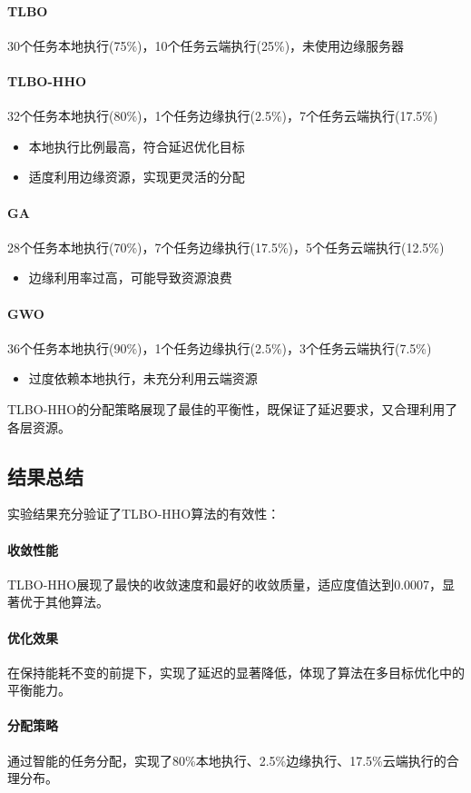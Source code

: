 \documentclass[conference]{IEEEtran}
\begin{document}
\paragraph{TLBO}30个任务本地执行(75\%)，10个任务云端执行(25\%)，未使用边缘服务器
\paragraph{TLBO-HHO}32个任务本地执行(80\%)，1个任务边缘执行(2.5\%)，7个任务云端执行(17.5\%)
    \begin{itemize}
        \item 本地执行比例最高，符合延迟优化目标
        \item 适度利用边缘资源，实现更灵活的分配
    \end{itemize}
\paragraph{GA}28个任务本地执行(70\%)，7个任务边缘执行(17.5\%)，5个任务云端执行(12.5\%)
    \begin{itemize}
        \item 边缘利用率过高，可能导致资源浪费
    \end{itemize}
\paragraph{GWO}36个任务本地执行(90\%)，1个任务边缘执行(2.5\%)，3个任务云端执行(7.5\%)
    \begin{itemize}
        \item 过度依赖本地执行，未充分利用云端资源
    \end{itemize}
TLBO-HHO的分配策略展现了最佳的平衡性，既保证了延迟要求，又合理利用了各层资源。
\subsection{结果总结}
实验结果充分验证了TLBO-HHO算法的有效性：
\paragraph{收敛性能}TLBO-HHO展现了最快的收敛速度和最好的收敛质量，适应度值达到0.0007，显著优于其他算法。
\paragraph{优化效果}在保持能耗不变的前提下，实现了延迟的显著降低，体现了算法在多目标优化中的平衡能力。
\paragraph{分配策略}通过智能的任务分配，实现了80\%本地执行、2.5\%边缘执行、17.5\%云端执行的合理分布。
\end{document}
